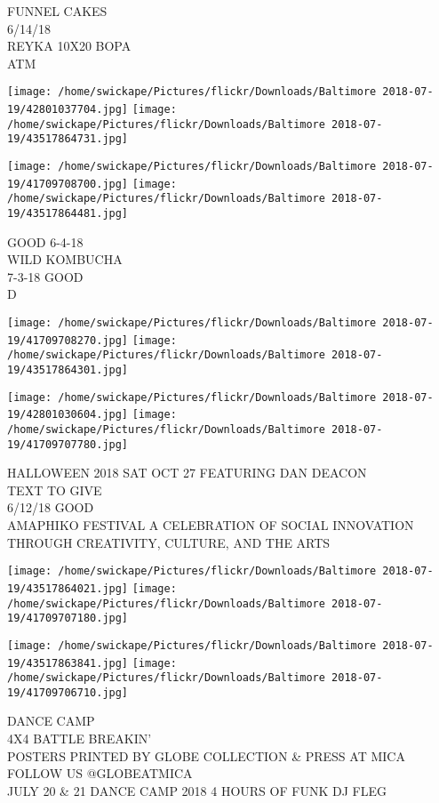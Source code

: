 \documentclass[10pt,letterpaper]{article}
\begin{document}
FUNNEL CAKES\\
6/14/18\\
REYKA 10X20 BOPA\\
ATM
\pagebreak

\texttt{[image: /home/swickape/Pictures/flickr/Downloads/Baltimore 2018-07-19/42801037704.jpg]}
\texttt{[image: /home/swickape/Pictures/flickr/Downloads/Baltimore 2018-07-19/43517864731.jpg]}

\texttt{[image: /home/swickape/Pictures/flickr/Downloads/Baltimore 2018-07-19/41709708700.jpg]}
\texttt{[image: /home/swickape/Pictures/flickr/Downloads/Baltimore 2018-07-19/43517864481.jpg]}

GOOD 6{-}4{-}18\\
WILD KOMBUCHA\\
7{-}3{-}18 GOOD\\
D
\pagebreak

\texttt{[image: /home/swickape/Pictures/flickr/Downloads/Baltimore 2018-07-19/41709708270.jpg]}
\texttt{[image: /home/swickape/Pictures/flickr/Downloads/Baltimore 2018-07-19/43517864301.jpg]}

\texttt{[image: /home/swickape/Pictures/flickr/Downloads/Baltimore 2018-07-19/42801030604.jpg]}
\texttt{[image: /home/swickape/Pictures/flickr/Downloads/Baltimore 2018-07-19/41709707780.jpg]}

HALLOWEEN 2018 SAT OCT 27 FEATURING DAN DEACON\\
TEXT TO GIVE\\
6/12/18 GOOD\\
AMAPHIKO FESTIVAL A CELEBRATION OF SOCIAL INNOVATION THROUGH CREATIVITY, CULTURE, AND THE ARTS
\pagebreak

\texttt{[image: /home/swickape/Pictures/flickr/Downloads/Baltimore 2018-07-19/43517864021.jpg]}
\texttt{[image: /home/swickape/Pictures/flickr/Downloads/Baltimore 2018-07-19/41709707180.jpg]}

\texttt{[image: /home/swickape/Pictures/flickr/Downloads/Baltimore 2018-07-19/43517863841.jpg]}
\texttt{[image: /home/swickape/Pictures/flickr/Downloads/Baltimore 2018-07-19/41709706710.jpg]}

DANCE CAMP\\
4X4 BATTLE BREAKIN'\\
POSTERS PRINTED BY GLOBE COLLECTION \& PRESS AT MICA FOLLOW US @GLOBEATMICA\\
JULY 20 \& 21 DANCE CAMP 2018 4 HOURS OF FUNK DJ FLEG
\pagebreak
\end{document}
